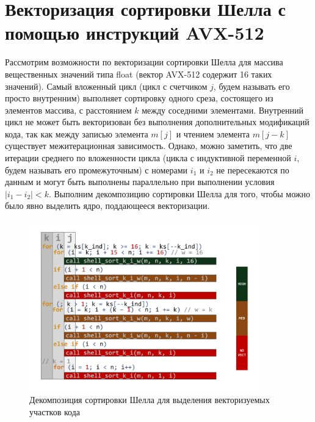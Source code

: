 \documentclass[utf8]{psta}
\begin{document}
\section{Векторизация сортировки Шелла с помощью инструкций AVX-512}

Рассмотрим возможности по векторизации сортировки Шелла для массива вещественных значений типа float (вектор AVX-512 содержит 16 таких значений). 
Самый вложенный цикл (цикл с счетчиком $j$, будем называть его просто внутренним) выполняет сортировку одного среза, состоящего из элементов массива, с расстоянием $k$ между соседними элементами.
Внутренний цикл не может быть векторизован без выполнения дополнительных модификаций кода, так как между записью элемента $m[j]$ и чтением элемента $m[j - k]$ существует межитерационная зависимость. 
Однако, можно заметить, что две итерации среднего по вложенности цикла (цикла с индуктивной переменной $i$, будем называть его промежуточным) с номерами $i_1$ и $i_2$ не пересекаются по данным и могут быть выполнены параллельно при выполнении условия $|i_1 - i_2| < k$. 
Выполним декомпозицию сортировки Шелла для того, чтобы можно было явно выделить ядро, поддающееся векторизации.

\begin{figure}
\includegraphics[width=10cm]{pics/pic_decomposition}
\caption{Декомпозиция сортировки Шелла для выделения векторизуемых участков кода}
\label{pic:decomposition}
\end{figure}
\end{document}
